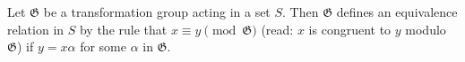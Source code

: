 Let $\mathfrak{G}$ be a transformation group acting in a set $S$. Then $\mathfrak{G}$ defines an equivalence relation in $S$ by the rule that $x \equiv y \pmod{\mathfrak{G}}$ (read: $x$ is congruent to $y$ modulo $\mathfrak{G}$) if $y = x\alpha$ for some $\alpha$ in $\mathfrak{G}$.
